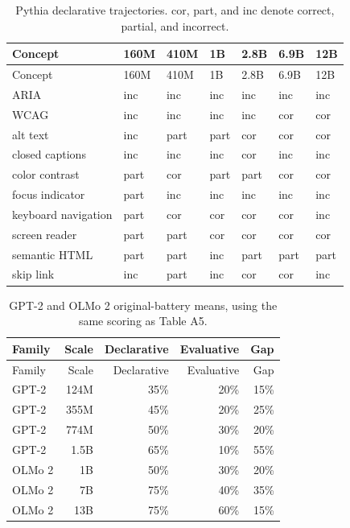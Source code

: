 \documentclass[
  english,
]{article}
\begin{document}
\begingroup\small
\begin{longtable}[]{@{}lllllll@{}}
\caption{Pythia declarative trajectories. cor, part, and inc denote correct, partial, and incorrect. \label{tab:trajectories}}\tabularnewline
\toprule\noalign{}
Concept & 160M & 410M & 1B & 2.8B & 6.9B & 12B \\
\midrule\noalign{}
\endfirsthead
\toprule\noalign{}
Concept & 160M & 410M & 1B & 2.8B & 6.9B & 12B \\
\midrule\noalign{}
\endhead
\bottomrule\noalign{}
\endlastfoot
ARIA & inc & inc & inc & inc & inc & inc \\
WCAG & inc & inc & inc & inc & cor & cor \\
alt text & inc & part & part & cor & cor & cor \\
closed captions & inc & inc & inc & cor & inc & inc \\
color contrast & part & cor & part & part & cor & cor \\
focus indicator & part & inc & inc & inc & inc & inc \\
keyboard navigation & part & cor & cor & cor & cor & inc \\
screen reader & part & part & cor & cor & cor & cor \\
semantic HTML & part & part & inc & part & part & part \\
skip link & inc & part & inc & cor & cor & inc \\
\end{longtable}
\endgroup

\begingroup\small
\begin{longtable}[]{@{}lrrrr@{}}
\caption{GPT-2 and OLMo 2 original-battery means, using the same scoring as Table A5. \label{tab:pooled-other}}\tabularnewline
\toprule\noalign{}
Family & Scale & Declarative & Evaluative & Gap \\
\midrule\noalign{}
\endfirsthead
\toprule\noalign{}
Family & Scale & Declarative & Evaluative & Gap \\
\midrule\noalign{}
\endhead
\bottomrule\noalign{}
\endlastfoot
GPT-2 & 124M & 35\% & 20\% & 15\% \\
GPT-2 & 355M & 45\% & 20\% & 25\% \\
GPT-2 & 774M & 50\% & 30\% & 20\% \\
GPT-2 & 1.5B & 65\% & 10\% & 55\% \\
OLMo 2 & 1B & 50\% & 30\% & 20\% \\
OLMo 2 & 7B & 75\% & 40\% & 35\% \\
OLMo 2 & 13B & 75\% & 60\% & 15\% \\
\end{longtable}
\endgroup
\end{document}
